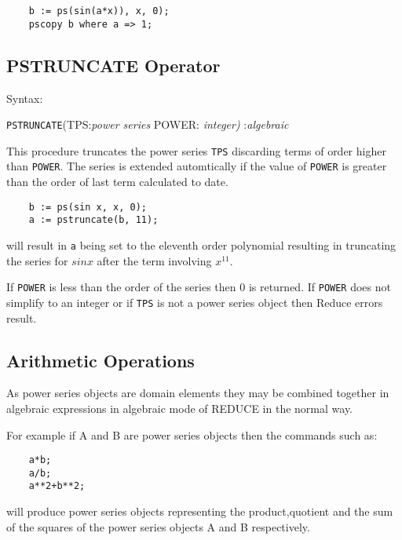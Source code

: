 \begin{verbatim}
    b := ps(sin(a*x)), x, 0);
    pscopy b where a => 1;
\end{verbatim}

\subsection{PSTRUNCATE Operator}

Syntax:

\hspace*{2em} {\tt PSTRUNCATE}(TPS:{\em power series} POWER: {\em integer)}
:{\em algebraic}

This procedure truncates the power series {\tt TPS} discarding terms
of order higher than {\tt POWER}. The series is extended automtically
if the value of {\tt POWER} is greater than the order of last term
calculated to date.

\begin{verbatim}
    b := ps(sin x, x, 0);
    a := pstruncate(b, 11);
\end{verbatim}

will result in {\tt a} being set to the eleventh order polynomial
resulting in truncating the series for $sin x$ after the term
involving $x^{11}$. 

If {\tt POWER} is less than the order of the series then $0$ is
returned.  If {\tt POWER} does not simplify to an integer or if 
{\tt TPS} is not a power series object then Reduce errors result.

\subsection{Arithmetic Operations}

As power series objects are domain elements they may be combined
together in algebraic expressions in algebraic mode of REDUCE in the
normal way.
 
For example if A and B are power series objects then the commands
such as:

 
 
\begin{verbatim}
    a*b;
    a/b;
    a**2+b**2;
\end{verbatim}

will produce power series objects representing the product,quotient
and the sum of the squares of the power series objects A and B
respectively.
 

